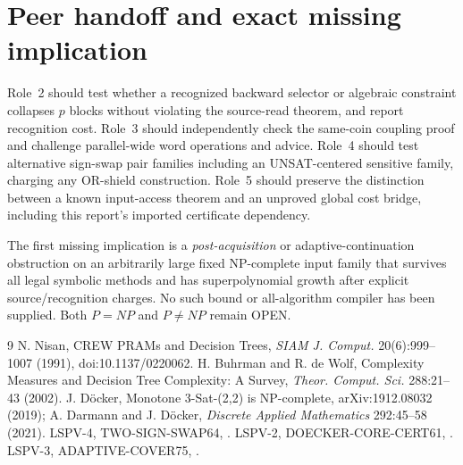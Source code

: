 \documentclass[11pt]{article}
\begin{document}
\section{Peer handoff and exact missing implication}
Role~2 should test whether a recognized backward selector or algebraic constraint collapses $p$ blocks without violating the source-read theorem, and report recognition cost. Role~3 should independently check the same-coin coupling proof and challenge parallel-wide word operations and advice. Role~4 should test alternative sign-swap pair families including an UNSAT-centered sensitive family, charging any OR-shield construction. Role~5 should preserve the distinction between a known input-access theorem and an unproved global cost bridge, including this report's imported certificate dependency.

The first missing implication is a \emph{post-acquisition} or adaptive-continuation obstruction on an arbitrarily large fixed NP-complete input family that survives all legal symbolic methods and has superpolynomial growth after explicit source/recognition charges. No such bound or all-algorithm compiler has been supplied. Both $P=NP$ and $P\ne NP$ remain OPEN.
\begin{thebibliography}{9}
 N. Nisan, CREW PRAMs and Decision Trees, \emph{SIAM J. Comput.} 20(6):999--1007 (1991), doi:10.1137/0220062.
 H. Buhrman and R. de Wolf, Complexity Measures and Decision Tree Complexity: A Survey, \emph{Theor. Comput. Sci.} 288:21--43 (2002).
 J. D\"ocker, Monotone 3-Sat-(2,2) is NP-complete, arXiv:1912.08032 (2019); A. Darmann and J. D\"ocker, \emph{Discrete Applied Mathematics} 292:45--58 (2021).
 LSPV-4, TWO-SIGN-SWAP64, .
 LSPV-2, DOECKER-CORE-CERT61, .
 LSPV-3, ADAPTIVE-COVER75, .
\end{thebibliography}
\end{document}
